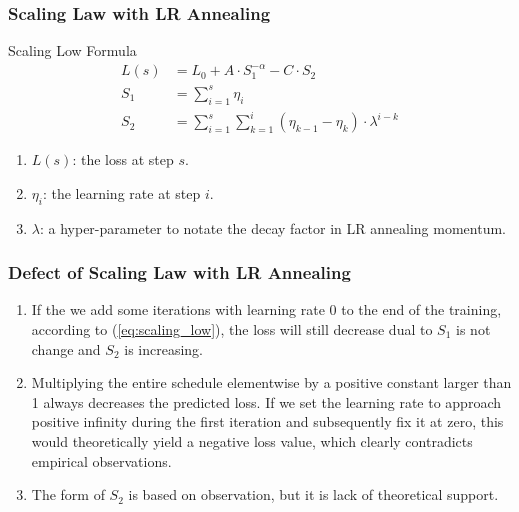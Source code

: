 \documentclass[aspectratio=169]{beamer}
\begin{document}
    \begin{frame}
        \frametitle{Scaling Law with LR Annealing}
        \begin{block}{Scaling Low Formula}
            \begin{equation}
                \label{eq:scaling_low}
                \begin{aligned}
                    L(s) &= L_0 + A\cdot S_1^{-\alpha} - C\cdot S_2 \\
                    S_1 &= \sum_{i=1}^{s} \eta_i \\
                    S_2 &= \sum_{i=1}^{s} \sum_{k=1}^{i} (\eta_{k-1} -
                    \eta_k)\cdot\lambda^{i-k}
                \end{aligned}
            \end{equation}
        \end{block}

        \begin{enumerate}
            \item $L(s)$: the loss at step $s$.
            \item $\eta_i$: the learning rate at step $i$.
            \item $\lambda$: a hyper-parameter to notate the decay factor
            in LR annealing momentum.
        \end{enumerate}
    \end{frame}

    \begin{frame}
        \frametitle{Defect of Scaling Law with LR Annealing}
        \begin{enumerate}
            \item If the we add some iterations with learning rate 0 to
            the end of the training, according to
            (\ref{eq:scaling_low}), the loss will still decrease dual
            to $S_1$ is not change and $S_2$ is increasing.
            \item Multiplying the entire schedule elementwise by a positive constant larger than 1 always decreases the predicted loss.
            If we set the learning rate to approach positive infinity during the first iteration and subsequently fix it at zero, this would theoretically yield a negative loss value, which clearly contradicts empirical observations.
            \item The form of $S_2$ is based on observation, but it is lack of
            theoretical support.
        \end{enumerate}
    \end{frame}
\end{document}
